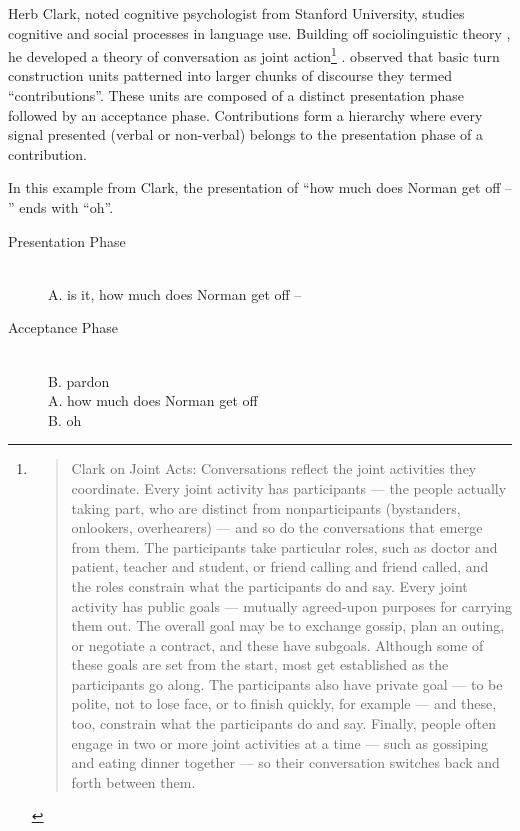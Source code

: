 Herb Clark, noted cognitive psychologist from Stanford University, studies cognitive and social processes in language use. Building off sociolinguistic theory  \citep{Schegloff:1973tg,Sacks:1974uy,Clark:1989ur,Schegloff:1977tc,Jefferson:1972ta},   he developed a theory of conversation as joint action\footnote{ \begin{quote} 
Clark on Joint Acts: Conversations reflect the joint activities they coordinate. Every joint activity has participants --- the people actually taking part, who are distinct from nonparticipants (bystanders, onlookers, overhearers) --- and so do the conversations that emerge from them. The participants take particular roles, such as doctor and patient, teacher and student, or friend calling and friend called, and the roles constrain what the participants do and say. Every joint activity has public goals --- mutually agreed-upon purposes for carrying them out. The overall goal may be to exchange gossip, plan an outing, or negotiate a contract, and these have subgoals. Although some of these goals are set from the start, most get established as the participants go along. The participants also have private goal --- to be polite, not to lose face, or to finish quickly, for example --- and these, too, constrain what the participants do and say. Finally, people often engage in two or more joint activities at a time --- such as gossiping and eating dinner together --- so their conversation switches back and forth between them. \citeyearpar[p. 2744]{Clark:2001uu}
\end{quote} }  \citep{Clark:2001uu}. \cite{Clark:1989ur}  observed that basic turn construction units patterned into larger chunks of discourse they termed ``contributions''. These units are composed of a distinct presentation phase followed by an acceptance phase. Contributions form a hierarchy where every signal presented (verbal or non-verbal) belongs to the presentation phase of a contribution.

In this example from Clark, the presentation of ``how much does Norman get off -- '' ends with ``oh''.

\begin{description}
\item[Presentation Phase] \hfill \\
A. is it, how much does Norman get off --
\item[Acceptance Phase]  \hfill \\
B. pardon \\
A. how much does Norman get off \\
B. oh
\end{description}

